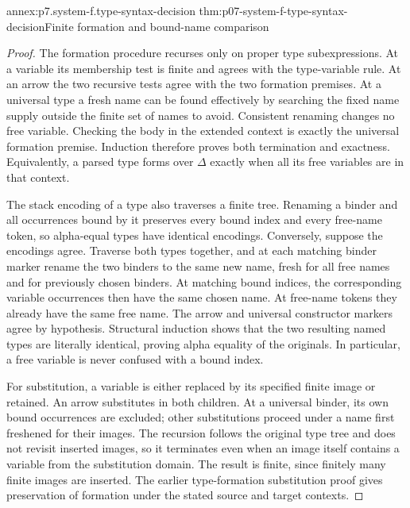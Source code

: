 \begin{annexitem}{annex:p7.system-f.type-syntax-decision}
 {thm:p07-system-f-type-syntax-decision}{Finite formation and bound-name comparison}
\begin{proof}
The formation procedure recurses only on proper type subexpressions.
At a variable its membership test is finite and agrees with the type-variable
rule. At an arrow the two recursive tests agree with the two formation
premises. At a universal type a fresh name can be found effectively by
searching the fixed name supply outside the finite set of names to avoid.
Consistent renaming changes no free variable. Checking the body in the
extended context is exactly the universal formation premise. Induction
therefore proves both termination and exactness. Equivalently, a parsed
type forms over \(\Delta\) exactly when all its free variables are
in that context.

The stack encoding of a type also traverses a finite tree. Renaming a
binder and all occurrences bound by it preserves every bound index and
every free-name token, so alpha-equal types have identical encodings.
Conversely, suppose the encodings agree. Traverse both types together,
and at each matching binder marker rename the two binders to the same
new name, fresh for all free names and for previously chosen binders.
At matching bound indices, the corresponding variable occurrences then
have the same chosen name. At free-name tokens they already have the
same free name. The arrow and universal constructor markers agree by
hypothesis. Structural induction shows that the two resulting named
types are literally identical, proving alpha equality of the originals.
In particular, a free variable is never confused with a bound index.

For substitution, a variable is either replaced by its specified finite
image or retained. An arrow substitutes in both children. At a universal
binder, its own bound occurrences are excluded; other substitutions proceed
under a name first freshened for their images. The recursion follows the
original type tree and does not revisit inserted images, so it terminates
even when an image itself contains a variable from the substitution domain.
The result is finite, since finitely many finite images are inserted.
The earlier type-formation substitution proof gives preservation of
formation under the stated source and target contexts.
\end{proof}
\end{annexitem}

